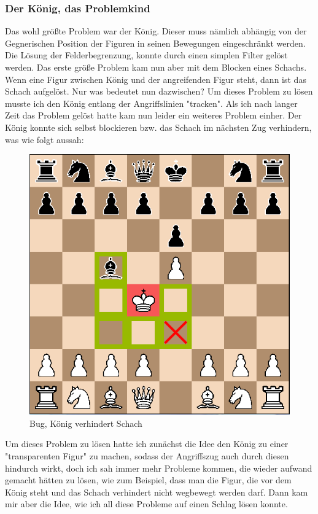 \documentclass[a4paper, 10pt]{scrartcl}
\begin{document}
\subsubsection{Der König, das Problemkind}
Das wohl größte Problem war der König. Dieser muss nämlich abhängig von der Gegnerischen Position der Figuren
in seinen Bewegungen eingeschränkt werden. Die Lösung der Felderbegrenzung, konnte durch einen simplen Filter gelöst werden. Das erste größe Problem kam nun aber mit dem
Blocken eines Schachs. Wenn eine Figur zwischen König und der angreifenden Figur steht, dann ist das Schach aufgelöst. Nur was bedeutet nun dazwischen?
Um dieses Problem zu lösen musste ich den König entlang der Angriffslinien "tracken". Als ich nach langer Zeit das Problem gelöst hatte kam nun leider ein weiteres Problem einher. 
Der König konnte sich selbst blockieren bzw. das Schach im nächsten Zug verhindern, was wie folgt aussah: 
\begin{figure}[!h]
\centering
\includegraphics[scale=0.6]{assets/Bug_king_blocking.png}
\caption{Bug, König verhindert Schach}
\end{figure}

Um dieses Problem zu lösen hatte ich zunächst die Idee den König zu einer "transparenten
Figur" zu machen, sodass der Angriffszug auch durch diesen hindurch wirkt, doch ich sah immer
mehr Probleme kommen, die wieder aufwand gemacht hätten zu lösen, wie zum Beispiel, dass man die 
Figur, die vor dem König steht und das Schach verhindert nicht wegbewegt werden darf. Dann kam mir
aber die Idee, wie ich all diese Probleme auf einen Schlag lösen konnte.
\end{document}
